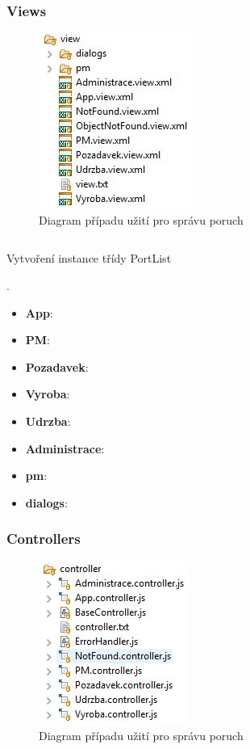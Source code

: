\documentclass[thesis=M,czech]{FITthesis}[2012/06/26]
\begin{document}
\subsubsection{Views}

\begin{figure}[H]
	\centering
	\includegraphics[]{images/fiori_app_view_struct}
	\caption{Diagram případu užití pro správu poruch}
	\label{img:uc_sprava_poruch}
\end{figure}

\begin{algorithm}[H]
	\begin{lstlisting}[language=xml]      
	\end{lstlisting}
	\caption{Vytvoření instance třídy PortList}	
	\label{code:PropertyChangeSupport}
	\small . 
\end{algorithm}	


\begin{itemize}
	\item
	\textbf{App}:
	\item
	\textbf{PM}:
	\item
	\textbf{Pozadavek}:
	\item
	\textbf{Vyroba}:
	\item
	\textbf{Udrzba}:
	\item
	\textbf{Administrace}:
\end{itemize} 

\begin{itemize}
	\item
	\textbf{pm}:
	\item
	\textbf{dialogs}:
\end{itemize} 

\subsubsection{Controllers}

\begin{figure}[H]
	\centering
	\includegraphics[]{images/fiori_app_controller_struct}
	\caption{Diagram případu užití pro správu poruch}
	\label{img:uc_sprava_poruch}
\end{figure}
\end{document}
